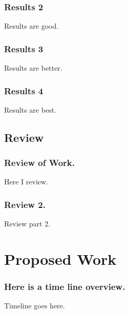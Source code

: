 \documentclass[compress]{beamer}
\begin{document}
\begin{frame}
\frametitle{Results 2}

Results are good.

\end{frame}
\begin{frame}
\frametitle{Results 3}

Results are better.

\end{frame}
\begin{frame}
\frametitle{Results 4}

Results are best.

\end{frame}
\subsection[Review]{Review}
\begin{frame}
\frametitle{Review of Work.}

Here I review.

\end{frame}
\begin{frame}
\frametitle{Review 2.}

Review part 2.

\end{frame}
\section[Proposed Work]{Proposed Work}
\begin{frame}
\frametitle{Here is a time line overview.}

Timeline goes here.

\end{frame}
\end{document}
